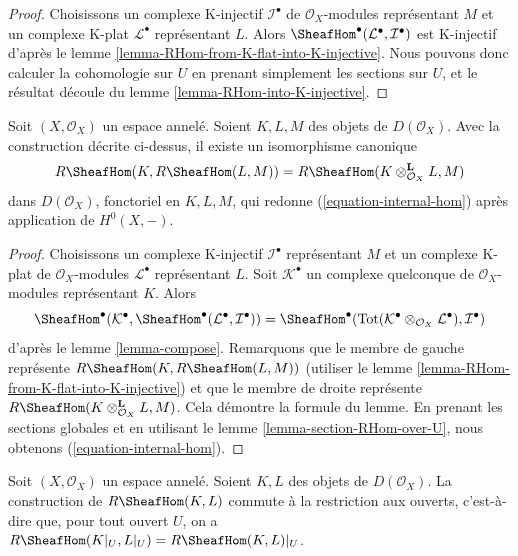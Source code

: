 {\begin{proof}
Choisissons un complexe K-injectif $\mathcal{I}^\bullet$ de $\mathcal{O}_X$-modules représentant $M$ et un complexe K-plat $\mathcal{L}^\bullet$ représentant $L$. Alors $\SheafHom^\bullet(\mathcal{L}^\bullet, \mathcal{I}^\bullet)$ est K-injectif d'après le lemme \ref{lemma-RHom-from-K-flat-into-K-injective}. Nous pouvons donc calculer la cohomologie sur $U$ en prenant simplement les sections sur $U$, et le résultat découle du lemme \ref{lemma-RHom-into-K-injective}.
\end{proof}

\begin{lemma}

\label{lemma-internal-hom}
Soit $(X, \mathcal{O}_X)$ un espace annelé. Soient $K, L, M$ des objets de $D(\mathcal{O}_X)$. Avec la construction décrite ci-dessus, il existe un isomorphisme canonique $$
R\SheafHom(K, R\SheafHom(L, M)) =
R\SheafHom(K \otimes_{\mathcal{O}_X}^\mathbf{L} L, M)
$$ dans $D(\mathcal{O}_X)$, fonctoriel en $K, L, M$, qui redonne (\ref{equation-internal-hom}) après application de $H^0(X, -)$.
\end{lemma}

\begin{proof}

Choisissons un complexe K-injectif $\mathcal{I}^\bullet$ représentant
$M$ et un complexe K-plat de $\mathcal{O}_X$-modules $\mathcal{L}^\bullet$
représentant $L$. Soit $\mathcal{K}^\bullet$ un complexe quelconque de
$\mathcal{O}_X$-modules représentant $K$. Alors
$$
\SheafHom^\bullet(\mathcal{K}^\bullet,
\SheafHom^\bullet(\mathcal{L}^\bullet, \mathcal{I}^\bullet))
=
\SheafHom^\bullet(
\text{Tot}(\mathcal{K}^\bullet \otimes_{\mathcal{O}_X} \mathcal{L}^\bullet),
\mathcal{I}^\bullet)
$$
d'après le lemme \ref{lemma-compose}. Remarquons que le membre de gauche représente
$R\SheafHom(K, R\SheafHom(L, M))$ (utiliser le lemme \ref{lemma-RHom-from-K-flat-into-K-injective}) et que le membre de droite représente
$R\SheafHom(K \otimes_{\mathcal{O}_X}^\mathbf{L} L, M)$. Cela démontre la formule du lemme. En prenant les sections globales et en utilisant le lemme \ref{lemma-section-RHom-over-U},
nous obtenons (\ref{equation-internal-hom}).

\end{proof}

\begin{lemma}

\label{lemma-restriction-RHom-to-U}
Soit $(X, \mathcal{O}_X)$ un espace annelé. Soient $K, L$ des objets de $D(\mathcal{O}_X)$. La construction de $R\SheafHom(K, L)$ commute à la restriction aux ouverts, c'est-à-dire que, pour tout ouvert $U$, on a $R\SheafHom(K|_U, L|_U) = R\SheafHom(K, L)|_U$.
\end{lemma}

}
